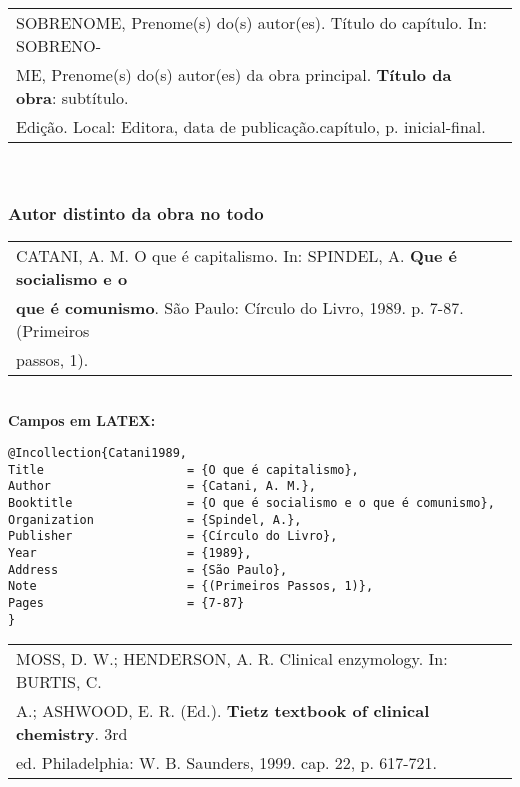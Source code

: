 \begin{tabular}{|l|c|} \hline
	SOBRENOME, Prenome(s) do(s) autor(es). Título do capítulo. In: SOBRENO- \\ME, Prenome(s) do(s) autor(es) da obra principal. \textbf{Título da obra}: subtítulo. \\Edição. Local: Editora, data de publicação.capítulo, p. inicial-final.     \\\hline
\end{tabular} \\
	
\subsubsection{Autor distinto da obra no todo} 
	
\begin{tabular}{|l|c|} \hline
	CATANI, A. M. O que é capitalismo. In: SPINDEL, A. \textbf{Que é socialismo e o} \\ \textbf{que é comunismo}. São Paulo: Círculo do Livro, 1989. p. 7-87. (Primeiros \\passos, 1).    \\\hline
\end{tabular} \\
	
\textbf{Campos em LATEX:} 
		
\begingroup
\fontsize{10pt}{12pt}\selectfont
\begin{verbatim}
@Incollection{Catani1989,
Title                    = {O que é capitalismo},
Author                   = {Catani, A. M.},
Booktitle                = {O que é socialismo e o que é comunismo},
Organization             = {Spindel, A.},
Publisher                = {Círculo do Livro},
Year                     = {1989},
Address                  = {São Paulo},
Note                     = {(Primeiros Passos, 1)},
Pages                    = {7-87}
}
\end{verbatim}
\endgroup
	
	
\begin{tabular}{|l|c|} \hline
	MOSS, D. W.; HENDERSON, A. R. Clinical enzymology. In: BURTIS, C. \\A.; ASHWOOD, E. R. (Ed.). \textbf{Tietz textbook of clinical chemistry}. 3rd\\ ed. Philadelphia: W. B. Saunders, 1999. cap. 22, p. 617-721.  \\\hline
\end{tabular} \\
	
